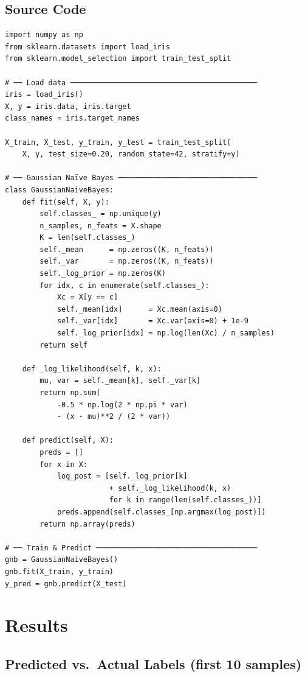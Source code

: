\documentclass[12pt,a4paper]{article}
\begin{document}
\subsection{Source Code}

\begin{lstlisting}[caption={GaussianNaiveBayes — from-scratch implementation}]
import numpy as np
from sklearn.datasets import load_iris
from sklearn.model_selection import train_test_split

# ── Load data ───────────────────────────────────────────
iris = load_iris()
X, y = iris.data, iris.target
class_names = iris.target_names

X_train, X_test, y_train, y_test = train_test_split(
    X, y, test_size=0.20, random_state=42, stratify=y)

# ── Gaussian Naïve Bayes ────────────────────────────────
class GaussianNaiveBayes:
    def fit(self, X, y):
        self.classes_ = np.unique(y)
        n_samples, n_feats = X.shape
        K = len(self.classes_)
        self._mean      = np.zeros((K, n_feats))
        self._var       = np.zeros((K, n_feats))
        self._log_prior = np.zeros(K)
        for idx, c in enumerate(self.classes_):
            Xc = X[y == c]
            self._mean[idx]      = Xc.mean(axis=0)
            self._var[idx]       = Xc.var(axis=0) + 1e-9
            self._log_prior[idx] = np.log(len(Xc) / n_samples)
        return self

    def _log_likelihood(self, k, x):
        mu, var = self._mean[k], self._var[k]
        return np.sum(
            -0.5 * np.log(2 * np.pi * var)
            - (x - mu)**2 / (2 * var))

    def predict(self, X):
        preds = []
        for x in X:
            log_post = [self._log_prior[k]
                        + self._log_likelihood(k, x)
                        for k in range(len(self.classes_))]
            preds.append(self.classes_[np.argmax(log_post)])
        return np.array(preds)

# ── Train & Predict ─────────────────────────────────────
gnb = GaussianNaiveBayes()
gnb.fit(X_train, y_train)
y_pred = gnb.predict(X_test)
\end{lstlisting}

\section{Results}

\subsection{Predicted vs.\ Actual Labels (first 10 samples)}
\end{document}
